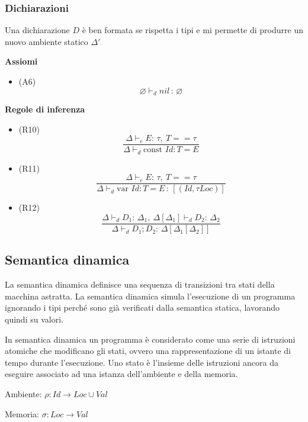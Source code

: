 \documentclass{article}
\begin{document}
\subsubsection{Dichiarazioni}
Una dichiarazione \(D\) è ben formata se rispetta i tipi e mi permette di produrre un nuovo ambiente statico \(\Delta'\)

\vspace{.2cm}

\noindent\textbf{Assiomi}
\begin{itemize}
    \item (A6) \[\varnothing \vdash_d nil \,:\, \varnothing\]
\end{itemize}

\noindent\textbf{Regole di inferenza}
\begin{itemize}
    \item (R10)
          \[\frac
              {\Delta \vdash_e E:\, \tau,\ T == \tau}
              {\Delta \vdash_d \text{const } Id:T = E}\]

    \item (R11)
          \[\frac
              {\Delta \vdash_e E:\, \tau,\ T == \tau}
              {\Delta \vdash_d \text{var } Id:T = E \,:\, [(Id, \tau Loc)]}\]

    \item (R12)
          \[\frac
              {\Delta \vdash_d D_1:\, \Delta_1,\ \Delta[\Delta_1] \vdash_d D_2:\, \Delta_2}
              {\Delta \vdash_d D_1;D_2:\, \Delta[\Delta_1[\Delta_2]]}\]
\end{itemize}

\pagebreak

\subsection{Semantica dinamica}
La semantica dinamica definisce una sequenza di transizioni tra stati della macchina astratta. La semantica dinamica simula l'esecuzione di un programma ignorando i tipi perché sono già verificati dalla semantica statica, lavorando quindi su valori.

In semantica dinamica un programma è considerato come una serie di istruzioni atomiche che modificano gli stati, ovvero una rappresentazione di un istante di tempo durante l'esecuzione. Uno stato è l'insieme delle istruzioni ancora da eseguire associato ad una istanza dell'ambiente e della memoria.

\begin{dfn}{Ambiente: }
    \(\rho: Id \rightarrow Loc \cup Val\)
\end{dfn}
\begin{dfn}{Memoria: }
    \(\sigma: Loc \rightarrow Val\)
\end{dfn}
\end{document}

